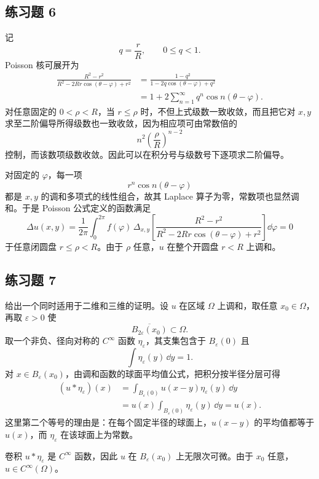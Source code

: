 \subsection*{练习题 6}
\begin{xsolution}
记
\[
  q=\frac{r}{R},\qquad 0\le q<1.
\]
Poisson 核可展开为
\begin{align*}
  \frac{R^2-r^2}{R^2-2Rr\cos(\theta-\varphi)+r^2}
  &=\frac{1-q^2}{1-2q\cos(\theta-\varphi)+q^2}\\
  &=1+2\sum_{n=1}^\infty q^n\cos n(\theta-\varphi).
\end{align*}
对任意固定的 $0<\rho<R$，当 $r\le\rho$ 时，不但上式级数一致收敛，而且把它对 $x,y$ 求至二阶偏导所得级数也一致收敛，因为相应项可由常数倍的
\[
  n^2\left(\frac{\rho}{R}\right)^{n-2}
\]
控制，而该数项级数收敛。因此可以在积分号与级数号下逐项求二阶偏导。

对固定的 $\varphi$，每一项
\[
  r^n\cos n(\theta-\varphi)
\]
都是 $x,y$ 的调和多项式的线性组合，故其 Laplace 算子为零，常数项也显然调和。于是 Poisson 公式定义的函数满足
\[
  \Delta u(x,y)
  =\frac{1}{2\pi}\int_0^{2\pi}
  f(\varphi)\,\Delta_{x,y}
  \left[
  \frac{R^2-r^2}{R^2-2Rr\cos(\theta-\varphi)+r^2}
  \right]\dd\varphi=0
\]
于任意闭圆盘 $r\le\rho<R$。由于 $\rho$ 任意，$u$ 在整个开圆盘 $r<R$ 上调和。
\end{xsolution}

\subsection*{练习题 7}
\begin{xsolution}
给出一个同时适用于二维和三维的证明。设 $u$ 在区域 $\Omega$ 上调和，取任意 $x_0\in\Omega$，再取 $\varepsilon>0$ 使
\[
  \overline{B_{2\varepsilon}(x_0)}\subset\Omega.
\]
取一个非负、径向对称的 $C^\infty$ 函数 $\eta_\varepsilon$，其支集包含于 $B_\varepsilon(0)$ 且
\[
  \int\eta_\varepsilon(y)\,\dd y=1.
\]
对 $x\in B_\varepsilon(x_0)$，由调和函数的球面平均值公式，把积分按半径分层可得
\begin{align*}
  (u*\eta_\varepsilon)(x)
  &=\int_{B_\varepsilon(0)}u(x-y)\eta_\varepsilon(y)\,\dd y\\
  &=u(x)\int_{B_\varepsilon(0)}\eta_\varepsilon(y)\,\dd y
  =u(x).
\end{align*}
这里第二个等号的理由是：在每个固定半径的球面上，$u(x-y)$ 的平均值都等于 $u(x)$，而 $\eta_\varepsilon$ 在该球面上为常数。

卷积 $u*\eta_\varepsilon$ 是 $C^\infty$ 函数，因此 $u$ 在 $B_\varepsilon(x_0)$ 上无限次可微。由于 $x_0$ 任意，$u\in C^\infty(\Omega)$。
\end{xsolution}

